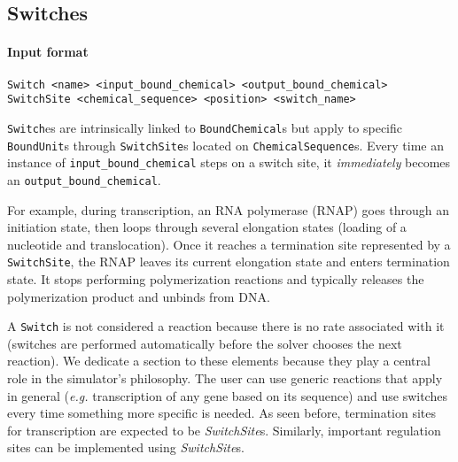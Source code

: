 
\subsection{Switches}

\paragraph{Input format}
\begin{verbatim}
Switch <name> <input_bound_chemical> <output_bound_chemical>
SwitchSite <chemical_sequence> <position> <switch_name>
\end{verbatim}

\texttt{Switch}es are intrinsically linked to \texttt{BoundChemical}s
but apply to specific \texttt{BoundUnit}s through \texttt{SwitchSite}s
located on \texttt{ChemicalSequence}s.
Every time an instance of \texttt{input\_bound\_chemical} steps on a switch site,
it \emph{immediately} becomes an \texttt{output\_bound\_chemical}.

For example, during transcription, an RNA polymerase (RNAP) goes through an
initiation state, then loops through several elongation states
(loading of a nucleotide and translocation).
Once it reaches a termination site represented by a \texttt{SwitchSite},
the RNAP leaves its current elongation state and enters termination state.
It stops performing polymerization reactions and typically releases the polymerization product
and unbinds from DNA.\@

A \texttt{Switch} is not considered a reaction because there is no rate associated with it
(switches are performed automatically before the solver chooses the next reaction).
We dedicate a section to these elements because they play a central role in the simulator's philosophy.
The user can use generic reactions that apply in general
(\textit{e.g.} transcription of any gene based on its sequence)
and use switches every time something more specific is needed.
As seen before, termination sites for transcription are expected to be \textit{SwitchSite}s.
Similarly, important regulation sites can be implemented using \textit{SwitchSite}s.
